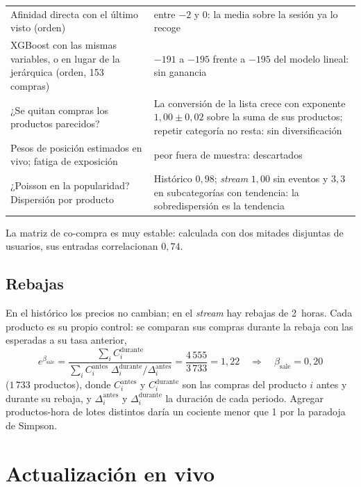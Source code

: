 \documentclass[11pt,a4paper]{article}
\begin{document}
\begin{center}
\begin{longtable}{@{}p{7.9cm}p{7.4cm}@{}}
Afinidad directa con el último visto (orden) & entre $-2$ y $0$: la media sobre la sesión ya lo recoge\\
XGBoost con las mismas variables, o en lugar de la jerárquica (orden, 153 compras) & $-191$ a $-195$ frente a $-195$ del modelo lineal: sin ganancia\\
¿Se quitan compras los productos parecidos? & La conversión de la lista crece con exponente $1{,}00\pm0{,}02$ sobre la suma de sus productos; repetir categoría no resta: sin diversificación\\
Pesos de posición estimados en vivo; fatiga de exposición & peor fuera de muestra: descartados\\
¿Poisson en la popularidad? Dispersión por producto & Histórico $0{,}98$; \emph{stream} $1{,}00$ sin eventos y $3{,}3$ en subcategorías con tendencia: la sobredispersión es la tendencia\\
\bottomrule
\end{longtable}
\end{center}

La matriz de co-compra es muy estable: calculada con dos mitades disjuntas de usuarios, sus entradas
correlacionan $0{,}74$.

\subsection{Rebajas}

En el histórico los precios no cambian; en el \emph{stream} hay rebajas de 2~horas. Cada producto es su
propio control: se comparan sus compras durante la rebaja con las esperadas a su tasa anterior,
\[
e^{\beta_{\text{sale}}}=\frac{\sum_i C_i^{\text{durante}}}{\sum_i C_i^{\text{antes}}\;\Delta_i^{\text{durante}}/\Delta_i^{\text{antes}}}
=\frac{4\,555}{3\,733}=1{,}22\quad\Longrightarrow\quad\beta_{\text{sale}}=0{,}20
\]
($1\,733$ productos), donde $C_i^{\text{antes}}$ y $C_i^{\text{durante}}$ son las compras del producto $i$
antes y durante su rebaja, y $\Delta_i^{\text{antes}}$ y $\Delta_i^{\text{durante}}$ la duración de cada
periodo. Agregar productos-hora de lotes distintos daría un cociente menor que 1 por la
paradoja de Simpson.

\section{Actualización en vivo}
\end{document}
